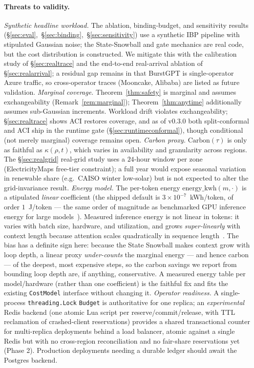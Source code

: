 \documentclass[11pt]{article}
\theoremstyle{plain}
\theoremstyle{definition}
\theoremstyle{remark}
\newcommand{\Carbon}{\mathrm{Carbon}}
\begin{document}
\paragraph{Threats to validity.}
\emph{Synthetic headline workload.} The ablation, binding-budget, and sensitivity results (\S\ref{sec:eval},~\S\ref{sec:binding},~\S\ref{sec:sensitivity}) use a synthetic IBP pipeline with stipulated Gaussian noise; the State-Snowball and gate mechanics are real code, but the cost distribution is constructed. We mitigate this with the calibration study of \S\ref{sec:realtrace} and the end-to-end real-arrival ablation of \S\ref{sec:realarrival}; a residual gap remains in that BurstGPT is single-operator Azure traffic, so cross-operator traces (Mooncake, Alibaba) are listed as future validation. \emph{Marginal coverage.} Theorem~\ref{thm:safety} is marginal and assumes exchangeability (Remark~\ref{rem:marginal}); Theorem~\ref{thm:anytime} additionally assumes sub-Gaussian increments. Workload drift violates exchangeability; \S\ref{sec:realtrace} shows ACI restores coverage, and as of v0.3.0 both split-conformal and ACI ship in the runtime gate (\S\ref{sec:runtimeconformal}), though conditional (not merely marginal) coverage remains open. \emph{Carbon proxy.} $\Carbon(\tau)$ is only as faithful as $\kappa(\rho,t)$, which varies in availability and granularity across regions. The \S\ref{sec:realgrid} real-grid study uses a $24$-hour window per zone (ElectricityMaps free-tier constraint); a full year would expose seasonal variation in renewable share (e.g.\ CAISO winter low-solar) but is not expected to alter the grid-invariance result. \emph{Energy model.} The per-token energy $\mathrm{energy\_kwh}(m,\cdot)$ is a stipulated \emph{linear} coefficient (the shipped default is $3{\times}10^{-7}$~kWh/token, of order $1$~J/token --- the same order of magnitude as benchmarked GPU inference energy for large models~\cite{samsi2023,luccioni2024}). Measured inference energy is not linear in tokens: it varies with batch size, hardware, and utilization, and grows \emph{super-linearly} with context length because attention scales quadratically in sequence length~\cite{samsi2023}. The bias has a definite sign here: because the State Snowball makes context grow with loop depth, a linear proxy \emph{under-counts} the marginal energy --- and hence carbon --- of the deepest, most expensive steps, so the carbon savings we report from bounding loop depth are, if anything, conservative. A measured energy table per model/hardware (rather than one coefficient) is the faithful fix and fits the existing \texttt{CostModel} interface without changing it. \emph{Operator readiness.} A single-process \texttt{threading.Lock} \texttt{Budget} is authoritative for one replica; an \emph{experimental} Redis backend (one atomic Lua script per reserve/commit/release, with TTL reclamation of crashed-client reservations) provides a shared transactional counter for multi-replica deployments behind a load balancer, atomic against a single Redis but with no cross-region reconciliation and no fair-share reservations yet (Phase 2). Production deployments needing a durable ledger should await the Postgres backend.
\end{document}
